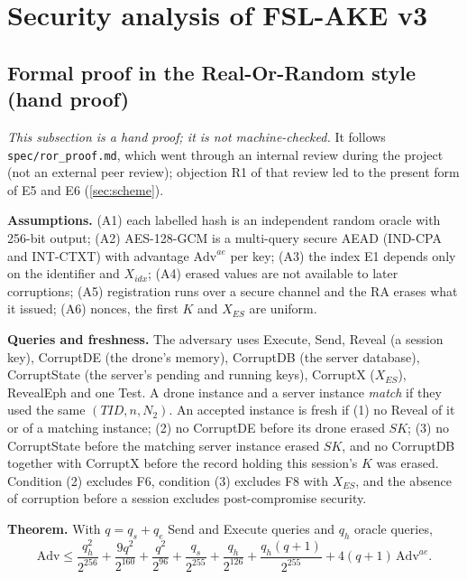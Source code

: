 \section{Security analysis of FSL-AKE v3}\label{sec:security}

\subsection{Formal proof in the Real-Or-Random style (hand proof)}\label{sec:ror}
\emph{This subsection is a hand proof; it is not machine-checked.} It follows \texttt{spec/ror\_proof.md}, which went through
an internal review during the project (not an external peer review); objection R1 of that review led to the present form of
E5 and E6 (\cref{sec:scheme}).

\textbf{Assumptions.} (A1) each labelled hash is an independent random oracle with 256-bit output; (A2) AES-128-GCM is a
multi-query secure AEAD (IND-CPA and INT-CTXT) with advantage $\mathrm{Adv}^{ae}$ per key; (A3) the index E1 depends only on
the identifier and $X_{idx}$; (A4) erased values are not available to later corruptions; (A5) registration runs over a secure
channel and the RA erases what it issued; (A6) nonces, the first $K$ and $X_{ES}$ are uniform.

\textbf{Queries and freshness.} The adversary uses \textsf{Execute}, \textsf{Send}, \textsf{Reveal} (a session key),
\textsf{CorruptDE} (the drone's memory), \textsf{CorruptDB} (the server database), \textsf{CorruptState} (the server's
pending and running keys), \textsf{CorruptX} ($X_{ES}$), \textsf{RevealEph} and one \textsf{Test}. A drone instance and a
server instance \emph{match} if they used the same $(TID, n, N_2)$. An accepted instance is fresh if (1) no \textsf{Reveal}
of it or of a matching instance; (2) no \textsf{CorruptDE} before its drone erased $SK$; (3) no \textsf{CorruptState} before the
matching server instance erased $SK$, and no \textsf{CorruptDB} together with \textsf{CorruptX} before the record holding this
session's $K$ was erased. Condition (2) excludes F6, condition (3) excludes F8 with $X_{ES}$, and the absence of corruption
before a session excludes post-compromise security.

\textbf{Theorem.} With $q = q_s + q_e$ \textsf{Send} and \textsf{Execute} queries and $q_h$ oracle queries,
\begin{equation*}
\mathrm{Adv} \le \frac{q_h^2}{2^{256}} + \frac{9q^2}{2^{160}} + \frac{q^2}{2^{96}} + \frac{q_s}{2^{255}} + \frac{q_h}{2^{126}}
 + \frac{q_h(q+1)}{2^{255}} + 4(q+1)\,\mathrm{Adv}^{ae}.
\end{equation*}

